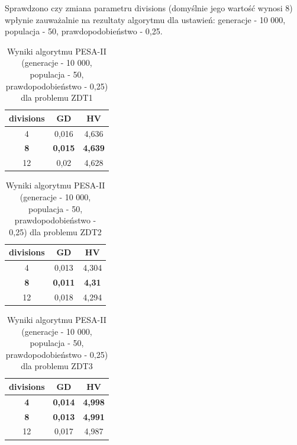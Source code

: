\documentclass{classrep}
\begin{document}
Sprawdzono czy zmiana parametru divisions (domyślnie jego wartość wynosi 8) wpłynie zauważalnie na rezultaty algorytmu dla ustawień: generacje - 10 000, populacja - 50, prawdopodobieństwo - 0,25.

\begin{table}[H]
\centering
\caption{Wyniki algorytmu PESA-II (generacje - 10 000, populacja - 50, prawdopodobieństwo - 0,25) dla problemu ZDT1}
\label{tab:PESAII_e_ZDT1}
\begin{tabular}{|c|c|c|}
\hline
\textbf{divisions} & \textbf{GD} & \textbf{HV} \\ \hline
4 & 0,016 & 4,636 \\ \hline
\textbf{8} & \textbf{0,015} & \textbf{4,639} \\ \hline
12 & 0,02 & 4,628 \\ \hline
\end{tabular}
\end{table}

\begin{table}[H]
\centering
\caption{Wyniki algorytmu PESA-II (generacje - 10 000, populacja - 50, prawdopodobieństwo - 0,25) dla problemu ZDT2}
\label{tab:PESAII_e_ZDT2}
\begin{tabular}{|c|c|c|}
\hline
\textbf{divisions} & \textbf{GD} & \textbf{HV} \\ \hline
4 & 0,013 & 4,304 \\ \hline
\textbf{8} & \textbf{0,011} & \textbf{4,31} \\ \hline
12 & 0,018 & 4,294 \\ \hline
\end{tabular}
\end{table}

\begin{table}[H]
\centering
\caption{Wyniki algorytmu PESA-II (generacje - 10 000, populacja - 50, prawdopodobieństwo - 0,25) dla problemu ZDT3}
\label{tab:PESAII_e_ZDT3}
\begin{tabular}{|c|c|c|}
\hline
\textbf{divisions} & \textbf{GD} & \textbf{HV} \\ \hline
\textbf{4} & \textbf{0,014} & \textbf{4,998} \\ \hline
\textbf{8} & \textbf{0,013} & \textbf{4,991} \\ \hline
12 & 0,017 & 4,987 \\ \hline
\end{tabular}
\end{table}
\end{document}
